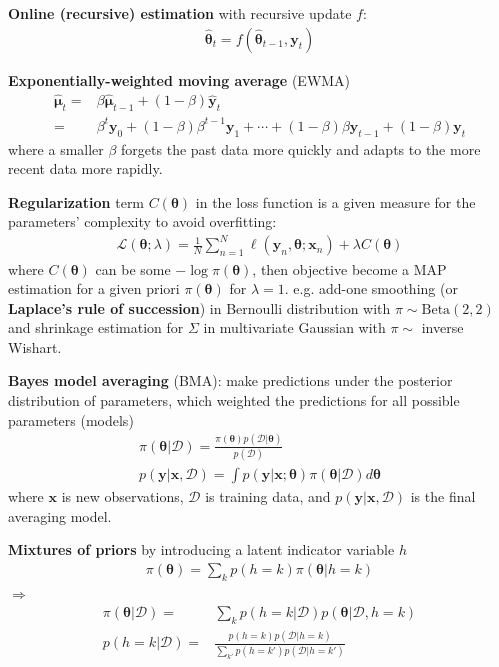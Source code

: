 \textbf{Online (recursive) estimation} with recursive update $f$:
\begin{gather}
    \hat{\bm{\theta}}_t=f(\hat{\bm{\theta}}_{t-1},\bm{y}_t)
\end{gather}

\begin{example}
    \textbf{Exponentially-weighted moving average} (EWMA)
    \begin{align}
        \hat{\bm{\mu}}_t
        =& \beta\hat{\bm{\mu}}_{t-1}+(1-\beta)\hat{\bm{y}}_t\\
        =& \beta^t\bm{y}_0 + (1-\beta)\beta^{t-1}\bm{y}_1 + \cdots + (1-\beta)\beta\bm{y}_{t-1} + (1-\beta)\bm{y}_t
    \end{align}
    where a smaller $\beta$ forgets the past data more quickly and 
    adapts to the more recent data more rapidly.
\end{example}

\textbf{Regularization} term $C(\bm{\theta})$ in the loss function is 
a given measure for the parameters' complexity to avoid overfitting:
\begin{gather}
    \mathcal{L}(\bm{\theta};\lambda)
    = \frac{1}{N}\sum_{n=1}^N\ell(\bm{y}_n,\bm{\theta};\bm{x}_n)
    + \lambda C(\bm{\theta})
\end{gather}
where $C(\bm{\theta})$ can be some $-\log{\pi(\bm{\theta})}$,
then objective become a MAP estimation for a given priori $\pi(\bm{\theta})$ for $\lambda=1$.
e.g. add-one smoothing (or \textbf{Laplace's rule of succession}) in Bernoulli distribution with $\pi\sim\text{Beta}(2,2)$ and shrinkage estimation for $\Sigma$ in multivariate Gaussian with $\pi\sim$ inverse Wishart. 

\textbf{Bayes model averaging} (BMA): make predictions under the posterior distribution of parameters, which weighted the predictions for all possible parameters (models)
\begin{gather}
    \pi(\bm{\theta}|\mathcal{D})
    = \frac{\pi(\bm{\theta})p(\mathcal{D}|\bm{\theta})}{p(\mathcal{D})}\\
    p(\bm{y}|\bm{x},\mathcal{D})
    = \int{p(\bm{y}|\bm{x};\bm{\theta})\pi(\bm{\theta}|\mathcal{D})}d\bm{\theta}
\end{gather}
where $\bm{x}$ is new observations, $\mathcal{D}$ is training data, and 
$p(\bm{y}|\bm{x},\mathcal{D})$ is the final averaging model.


\textbf{Mixtures of priors} by introducing a latent indicator variable $h$
\begin{gather}
    \pi(\bm{\theta})=\sum_k p(h=k)\pi(\bm{\theta}|h=k)
\end{gather}
$\Rightarrow$
\begin{align}
    \pi(\bm{\theta}|\mathcal{D})
    =& \sum_k{p(h=k|\mathcal{D})p(\bm{\theta}|\mathcal{D},h=k)}\\
    p(h=k|\mathcal{D})
    =& \frac{p(h=k)p(\mathcal{D}|h=k)}{\sum_{k'}{p(h=k')p(\mathcal{D}|h=k')}}
\end{align}

